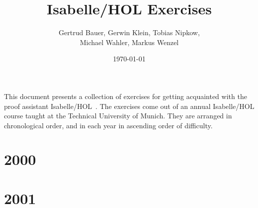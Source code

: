 
\usepackage{graphicx}
\usepackage[colorlinks,hyperindex]{hyperref}

\newcommand{\aufgabe}[3]{

}

\title{Isabelle/HOL Exercises}
\date{\today}
\author{Gertrud Bauer, Gerwin Klein, Tobias Nipkow,\\ Michael Wahler, Markus Wenzel}



\maketitle

This document presents a collection of exercises for getting
acquainted with the proof assistant
Isabelle/HOL~\cite{isabelle-tutorial}.  The exercises come out of an
annual Isabelle/HOL course taught at the Technical University of
Munich. They are arranged in chronological order, and in each year in
ascending order of difficulty.

\tableofcontents


\newpage
\section{2000}
\aufgabe{2000}{a1}{Snoc}
\aufgabe{2000}{a1}{Arithmetic}
\aufgabe{2000}{a1}{Hanoi}


\newpage
\section{2001}
\aufgabe{2001}{a1}{Aufgabe1}
\aufgabe{2001}{a2}{Aufgabe2}
\aufgabe{2001}{a3}{Trie1}
\aufgabe{2001}{a3}{Trie2}
\aufgabe{2001}{a3}{Trie3}
\aufgabe{2001}{a5}{Aufgabe5}

